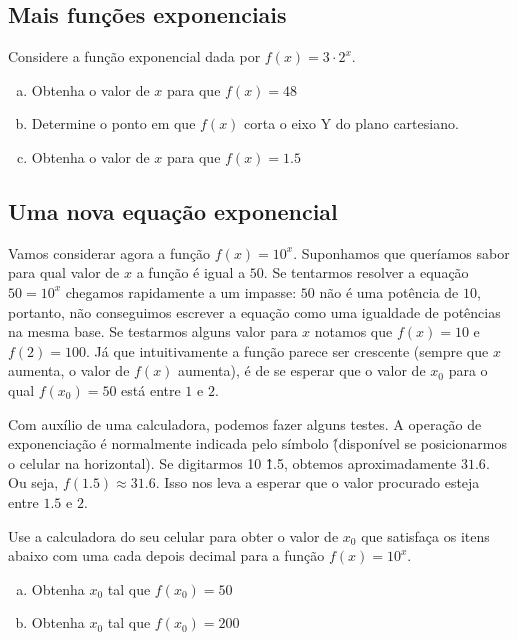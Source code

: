 \documentclass[main_estudante.tex]{subfiles}
\begin{document}
\subsection*{Mais funções exponenciais}

\begin{questao}
Considere a função exponencial dada por $f(x)=3 \cdot 2^x$.
\begin{enumerate}[a)]
\item Obtenha o valor de $x$ para que $f(x)=48$
\item Determine o ponto em que $f(x)$ corta o eixo Y do plano cartesiano.
\item Obtenha o valor de $x$ para que $f(x)=1.5$
\end{enumerate}
\end{questao}

\subsection*{Uma nova equação exponencial}

Vamos considerar agora a função $f(x)=10^x$. Suponhamos que queríamos sabor para qual valor de $x$ a função é igual a $50$. Se tentarmos resolver a equação $50=10^x$ chegamos rapidamente a um impasse: $50$ não é uma potência de $10$, portanto, não conseguimos escrever a equação como uma igualdade de potências na mesma base. Se testarmos alguns valor para $x$ notamos que $f(x)=10$ e $f(2)=100$. Já que intuitivamente a função parece ser crescente (sempre que $x$ aumenta, o valor de $f(x)$ aumenta), é de se esperar que o valor de $x_0$ para o qual $f(x_0)=50$ está entre $1$ e $2$.

Com auxílio de uma calculadora, podemos fazer alguns testes. A operação de exponenciação é normalmente indicada pelo símbolo \^ (disponível se posicionarmos o celular na horizontal). Se digitarmos 10 \^ 1.5, obtemos aproximadamente $31.6$. Ou seja, $f(1.5) \approx 31.6$. Isso nos leva a esperar que o valor procurado esteja entre $1.5$ e $2$.

\begin{questao}
Use a calculadora do seu celular para obter o valor de $x_0$ que satisfaça os itens abaixo com uma cada depois decimal para a função $f(x)=10^x$.
\begin{enumerate}[a)]
\item Obtenha $x_0$ tal que $f(x_0)=50$
\item Obtenha $x_0$ tal que $f(x_0)=200$
\end{enumerate}
\end{questao}
\end{document}
